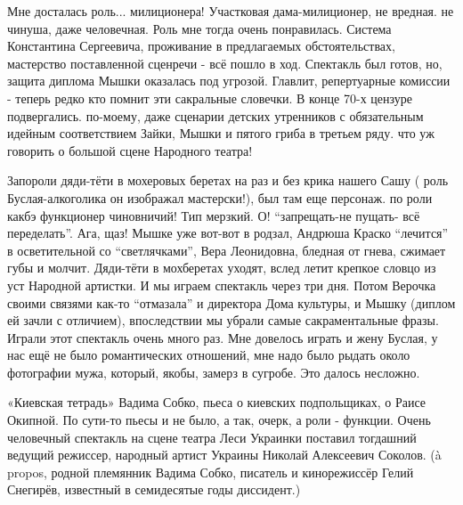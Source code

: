 
Мне досталась
роль... милиционера! Участковая дама-милиционер, не вредная. не чинуша, даже
человечная. Роль мне тогда очень понравилась.  Система Константина Сергеевича,
проживание в предлагаемых обстоятельствах, мастерство поставленной сценречи -
всё пошло в ход. Спектакль был готов, но, защита диплома Мышки оказалась под
угрозой. Главлит, репертуарные комиссии - теперь редко кто помнит эти
сакральные словечки. В конце 70-х цензуре подвергались. по-моему, даже сценарии
детских утренников с обязательным идейным соответствием Зайки, Мышки и пятого
гриба в третьем ряду. что уж говорить о большой сцене Народного театра!

\raggedcolumns
\begin{multicols}{2} %
\setlength{\parindent}{0pt}



\end{multicols} %

Запороли дяди-тёти в мохеровых беретах на раз и без крика нашего Сашу ( роль
Буслая-алкоголика он изображал мастерски!), был там еще персонаж. по роли
какбэ функционер чиновничий! Тип мерзкий. О! \enquote{запрещать-не пущать- всё
переделать}. Ага, щаз! Мышке уже вот-вот в родзал, Андрюша Краско \enquote{лечится} в
осветительной со \enquote{светлячками}, Вера Леонидовна, бледная от гнева, сжимает
губы и молчит. Дяди-тёти в мохберетах уходят, вслед летит крепкое словцо из уст
Народной артистки. И мы играем спектакль через три дня. Потом Верочка своими
связями как-то \enquote{отмазала} и директора Дома культуры, и Мышку (диплом ей зачли с
отличием),  впоследствии мы убрали самые сакраментальные фразы. Играли этот
спектакль  очень много раз. Мне довелось играть и жену Буслая, у нас ещё не
было романтических отношений, мне надо было рыдать около фотографии мужа,
который, якобы, замерз в сугробе. Это далось несложно.

«Киевская тетрадь» Вадима Собко, пьеса о киевских подпольщиках, о Раисе
Окипной. По сути-то пьесы и не было, а так, очерк, а роли - функции. Очень
человечный спектакль на сцене театра Леси Украинки поставил тогдашний ведущий
режиссер, народный артист Украины Николай Алексеевич Соколов.  (à propos,
родной племянник Вадима Собко, писатель и кинорежиссёр Гелий Снегирёв,
известный в семидесятые годы диссидент.)


